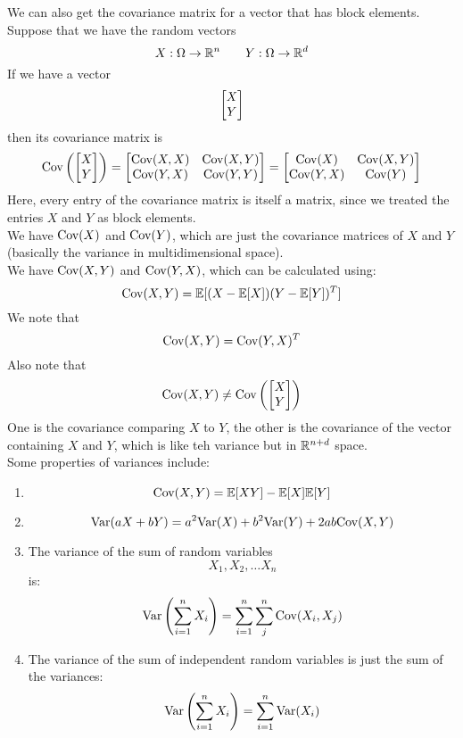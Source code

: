 \documentclass[12pt]{article}
\begin{document}
    We can also get the covariance
    matrix for a vector that has
    block elements. \\
    Suppose that we have the random vectors
    \[ X: \Omega \to \mathbb{R}^n
    \qquad Y: \Omega \to \mathbb{R}^d \]
    If we have a vector
    \[ \begin{bmatrix} X \\ Y \end{bmatrix} \]
    then its covariance matrix is
    \[ \text{Cov}\left( \begin{bmatrix} X \\ Y \end{bmatrix} \right)
    = \begin{bmatrix} \text{Cov}(X, X) & \text{Cov}(X, Y) \\ \text{Cov}(Y, X) & \text{Cov}(Y, Y) \end{bmatrix}
    = \begin{bmatrix} \text{Cov}(X) & \text{Cov}(X, Y) \\ \text{Cov}(Y, X) & \text{Cov}(Y) \end{bmatrix} \]
    Here, every entry of the covariance
    matrix is itself a matrix,
    since we treated the entries
    $X$ and $Y$ as block elements. \\
    We have $\text{Cov}(X)$ and $\text{Cov}(Y)$,
    which are just the covariance 
    matrices of $X$ and $Y$
    (basically the variance in
    multidimensional space). \\
    We have $\text{Cov}(X, Y)$
    and $\text{Cov}(Y, X)$,
    which can be calculated
    using:
    \[ \text{Cov}(X, Y) = 
    \mathbb{E}[(X - \mathbb{E}[X])(Y - \mathbb{E}[Y])^T] \]
    We note that
    \[ \text{Cov}(X, Y) = 
    \text{Cov}(Y, X)^T \]
    Also note that
    \[ \text{Cov}(X, Y) \neq 
    \text{Cov}\left( \begin{bmatrix} X \\ Y \end{bmatrix} \right) \]
    One is the covariance comparing
    $X$ to $Y$,
    the other is the covariance of the
    vector containing $X$ and $Y$,
    which is like teh variance but in
    $\mathbb{R}^{n + d}$ space. \\

    Some properties of variances include:
    \begin{enumerate}
        \item 
        \[ \text{Cov}(X, Y) = \mathbb{E}[XY] - \mathbb{E}[X]\mathbb{E}[Y] \]
        \item
        \[ \text{Var}(aX + bY)
        = a^2\text{Var}(X) + b^2\text{Var}(Y)
        + 2ab\text{Cov}(X, Y) \]
        \item
        The variance of the sum
        of random variables
        \[ X_1, X_2, \dots X_n \]
        is:
        \[ \text{Var}\left( \sum_{i=1}^{n}X_i \right)
        = \sum_{i=1}^{n}\sum_{j}^{n}
        \text{Cov}(X_i, X_j) \]
        \item
        The variance of the sum of
        independent random variables is
        just the sum of the variances:
        \[ \text{Var}\left( \sum_{i=1}^{n}X_i \right)
        = \sum_{i=1}^{n} \text{Var}(X_i) \] \\
    \end{enumerate}
\end{document}
